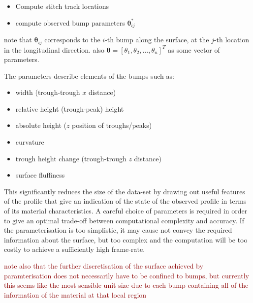\documentclass[12pt]{report}
\newcommand{\tcr}[1]{\textcolor{darkRed}{#1}}
\begin{document}
        \begin{itemize}
            \item Compute stitch track locations 
            \item compute observed bump parameters $\pmb{\theta}^*_{ij}$
        \end{itemize}
        
        note that $\pmb{\theta}_{ij}$ corresponds to the $i$-th bump along the surface, at the $j$-th location in the longitudinal direction. also $\pmb{\theta} = [\theta_1,\theta_2,\ldots ,\theta_n]^T$ as some vector of parameters.
        
        The parameters describe elements of the bumps such as:
        \begin{itemize}
            \item width (trough-trough $x$ distance)
            \item relative height (trough-peak) height
            \item absolute height ($z$ position of troughs/peaks)
            \item curvature
            \item trough height change (trough-trough $z$ distance)
            \item surface fluffiness
        \end{itemize}
         
        This significantly reduces the size of the data-set by drawing out useful features of the profile that give an indication of the state of the observed profile in terms of its material characteristics. A careful choice of parameters is required in order to give an optimal trade-off between computational complexity and accuracy. If the parameterisation is too simplistic, it may cause not convey the required information about the surface, but too complex and the computation will be too costly to achieve a sufficiently high frame-rate.
        
        \tcr{note also that the further discretisation of the surface achieved by paramterisation does not necessarily have to be confined to bumps, but currently this seems like the most sensible unit size due to each bump containing all of the information of the material at that local region}
        
\end{document}
